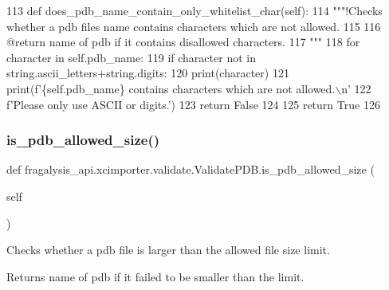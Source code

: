 \begin{DoxyCode}
113     \textcolor{keyword}{def }does\_pdb\_name\_contain\_only\_whitelist\_char(self):
114         \textcolor{stringliteral}{"""!Checks whether a pdb files name contains characters which are not allowed.}
115 \textcolor{stringliteral}{}
116 \textcolor{stringliteral}{        @return name of pdb if it contains disallowed characters.}
117 \textcolor{stringliteral}{        """}
118         \textcolor{keywordflow}{for} character \textcolor{keywordflow}{in} self.pdb\_name:
119             \textcolor{keywordflow}{if} character \textcolor{keywordflow}{not} \textcolor{keywordflow}{in} string.ascii\_letters+string.digits:
120                 print(character)
121                 print(f\textcolor{stringliteral}{'\{self.pdb\_name\} contains characters which are not allowed.\(\backslash\)n'}
122                       f\textcolor{stringliteral}{'Please only use ASCII or digits.'})
123                 \textcolor{keywordflow}{return} \textcolor{keyword}{False}
124 
125         \textcolor{keywordflow}{return} \textcolor{keyword}{True}
126 
\end{DoxyCode}
\mbox{\label{classfragalysis__api_1_1xcimporter_1_1validate_1_1_validate_p_d_b_a9e9a8abbb1d90bb2cd17702178831f93}} 
\subsubsection{\texorpdfstring{is\+\_\+pdb\+\_\+allowed\+\_\+size()}{is\_pdb\_allowed\_size()}}
{\footnotesize\ttfamily def fragalysis\+\_\+api.\+xcimporter.\+validate.\+Validate\+P\+D\+B.\+is\+\_\+pdb\+\_\+allowed\+\_\+size (\begin{DoxyParamCaption}\item[{}]{self }\end{DoxyParamCaption})}



Checks whether a pdb file is larger than the allowed file size limit. 

\begin{DoxyReturn}{Returns}
name of pdb if it failed to be smaller than the limit. 
\end{DoxyReturn}


